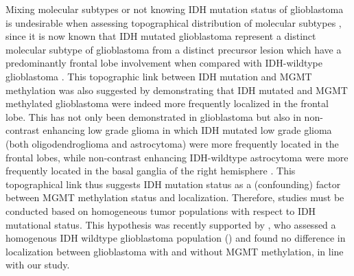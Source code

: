 Mixing molecular subtypes or not knowing \gls{IDH} mutation status of glioblastoma is undesirable when assessing topographical distribution of molecular subtypes \autocite{louis20162016}, since it is now known that \gls{IDH} mutated glioblastoma represent a distinct molecular subtype of glioblastoma from a distinct precursor lesion which have a predominantly frontal lobe involvement when compared with \gls{IDH}-wildtype glioblastoma \autocite{lai2011evidence}.
This topographic link between \gls{IDH} mutation and \gls{MGMT} methylation was also suggested by  demonstrating that \gls{IDH} mutated and \gls{MGMT} methylated glioblastoma were indeed more frequently localized in the frontal lobe.
This has not only been demonstrated in glioblastoma but also in non-contrast enhancing low grade glioma in which \gls{IDH} mutated low grade glioma (both oligodendroglioma and astrocytoma) were more frequently located in the frontal lobes, while non-contrast enhancing \gls{IDH}-wildtype astrocytoma were more frequently located in the basal ganglia of the right hemisphere \autocite{chaichana2011factors}.
This topographical link thus suggests \gls{IDH} mutation status as a (confounding) factor between \gls{MGMT} methylation status and localization.
Therefore, studies must be conducted based on homogeneous \gls{tumor} populations with respect to \gls{IDH} mutational status.
This hypothesis was recently supported by , who assessed a homogenous \gls{IDH} wildtype glioblastoma population () and found no difference in localization between glioblastoma with and without \gls{MGMT} methylation, in line with our study.

